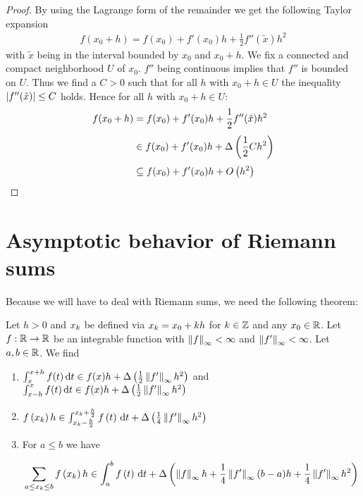 \begin{proof}
  By using the Lagrange form of the remainder we get the following Taylor expansion \cite[p. 284]{koenigsberger}
  \begin{align}
    f(x_0+h)=f(x_0)+f'(x_0)h + \frac 12 f''(\tilde x) h^2
  \end{align}
  with $\tilde x$ being in the interval bounded by $x_0$ and $x_0+h$. We fix a connected and compact neighborhood $U$ of $x_0$. $f''$ being continuous implies that $f''$ is bounded on $U$. Thus we find a $C > 0$ such that for all $h$ with $x_0+h\in U$ the inequality $\abs{f''(\tilde x)} \le C$ holds. Hence for all $h$ with $x_0+h\in U$:
  \begin{align}
    f(x_0+h)& =f(x_0)+f'(x_0)h + \frac 12 f''(\tilde x) h^2 \nl
    & \in f(x_0)+f'(x_0)h + \bigabs{\frac 12 C h^2} \nl
    & \subseteq f(x_0)+f'(x_0)h + \bigo{h^2}
  \end{align}
\end{proof}

\section{Asymptotic behavior of Riemann sums}

Because we will have to deal with Riemann sums, we need the following theorem:

\begin{theorem} \label{thm:asymptotics_riemann}
  Let $h > 0$ and $\x[k]$ be defined via $\x[k] = \x[0] + kh$ for $k\in\Z$ and any $\x[0]\in\R$. Let $f:\R\to\R$ be an integrable function with $\snorm{f} < \infty$ and $\snorm{f'} < \infty$. Let $a,b\in\R$. We find

  \begin{enumerate}
    \item \label{rieman_first_rule} $\int_x^{x+h} f(t) \d{t} \in f(x)h + \bigabs{\frac 12 \snorm{f'} h^2}$ and $\int_{x-h}^x f(t) \d{t} \in f(x) h + \bigabs{\frac 12 \snorm{f'} h^2}$
    \item \label{riemann_int} $\f{\x} h \in \int_{\x-\frac h2}^{\x + \frac h2} \f{t}\d{t} + \bigabs{\frac 14 \snorm{f'} h^2}$
    \item For $a \le b$ we have

      \begin{align}
        \sum_{a \le \x \le b} \f{\x} h \in \int_a^b \f{t}\d{t} + \bigabs{\snorm{f} h + \frac 14 \snorm{f'}(b-a)h + \frac 14 \snorm{f'}h^2}
      \end{align}
  \end{enumerate}
\end{theorem}

